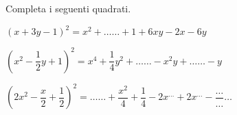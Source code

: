 \begin{esercizio}
 \label{ese:11.11}
Completa i seguenti quadrati.

\begin{enumeratea}
\spazielenx
\item \(\left(x+3y-1\right)^{2}=x^{2}+\ldots \ldots +1+6xy-2x-6y\)
\item 
\(\left(x^{2}-\dfrac{1}{2}y+1\right)^{2}=x^{4}+\dfrac{1}{4}y^{2}+\ldots\ldots 
-x^{2}y+\ldots\ldots -y\)
\item \(\left(2x^{2}-\dfrac{x}{2}+\dfrac{1}{2}\right)^{2}=\ldots\ldots 
+\dfrac{x^{2}}{4}%
+\dfrac{1}{4}-2x^{\ldots }+2x^{\ldots}-\dfrac{\ldots}{\ldots}\ldots \)
\end{enumeratea}
\end{esercizio}
% 
% 
% 
% 
% 
